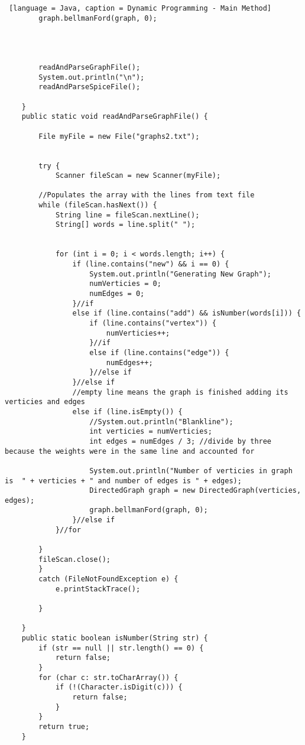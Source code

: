 \documentclass{article}
\begin{document}
\begin{lstlisting} [language = Java, caption = Dynamic Programming - Main Method]
        graph.bellmanFord(graph, 0);

        


        readAndParseGraphFile();
        System.out.println("\n");
        readAndParseSpiceFile();

    }
    public static void readAndParseGraphFile() {

        File myFile = new File("graphs2.txt");


        try {
            Scanner fileScan = new Scanner(myFile);

        //Populates the array with the lines from text file
        while (fileScan.hasNext()) {
            String line = fileScan.nextLine();
            String[] words = line.split(" ");

            
            for (int i = 0; i < words.length; i++) {
                if (line.contains("new") && i == 0) {
                    System.out.println("Generating New Graph");
                    numVerticies = 0;
                    numEdges = 0;
                }//if
                else if (line.contains("add") && isNumber(words[i])) {
                    if (line.contains("vertex")) {
                        numVerticies++;
                    }//if
                    else if (line.contains("edge")) {
                        numEdges++;
                    }//else if
                }//else if
                //empty line means the graph is finished adding its verticies and edges
                else if (line.isEmpty()) {
                    //System.out.println("Blankline");
                    int verticies = numVerticies;
                    int edges = numEdges / 3; //divide by three because the weights were in the same line and accounted for

                    System.out.println("Number of verticies in graph is  " + verticies + " and number of edges is " + edges);
                    DirectedGraph graph = new DirectedGraph(verticies, edges);
                    graph.bellmanFord(graph, 0);
                }//else if
            }//for
            
        }
        fileScan.close();            
        }
        catch (FileNotFoundException e) {
            e.printStackTrace();

        }

    }
    public static boolean isNumber(String str) {
        if (str == null || str.length() == 0) {
            return false;
        }
        for (char c: str.toCharArray()) {
            if (!(Character.isDigit(c))) {
                return false;
            }
        }
        return true;
    }


\end{lstlisting}
\end{document}
